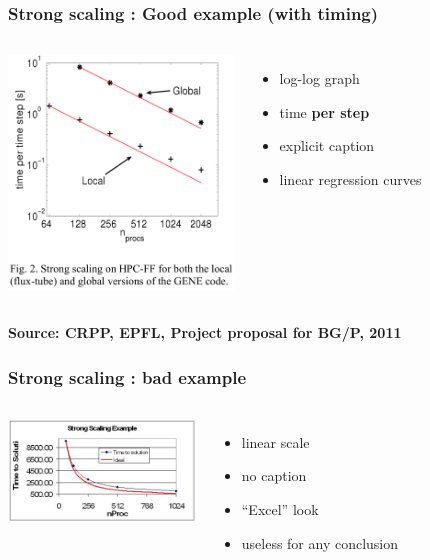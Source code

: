 \begin{frame}[containsverbatim]
	\frametitle{Strong scaling : Good example (with timing)}

\begin{columns}
\begin{center}
\includegraphics[width=6cm]{Day4/images/strong-good.png}
\end{center}

\begin{itemize}
	\item {log-log graph}
	\item {time \textbf{per step}}
	\item {explicit caption}
	\item {linear regression curves}
\end{itemize}
\end{columns}
\textbf{Source: CRPP, EPFL, Project proposal for BG/P, 2011}

\end{frame}


\begin{frame}[containsverbatim]
	\frametitle{Strong scaling : bad example}

\begin{columns}
\begin{center}
\includegraphics[width=5cm]{Day4/images/strong-bad.png}
\end{center}

\begin{itemize}
	\item {linear scale}
	\item {no caption}
	\item {``Excel'' look}
	\item {useless for any conclusion}
\end{itemize}
\end{columns}

\end{frame}


